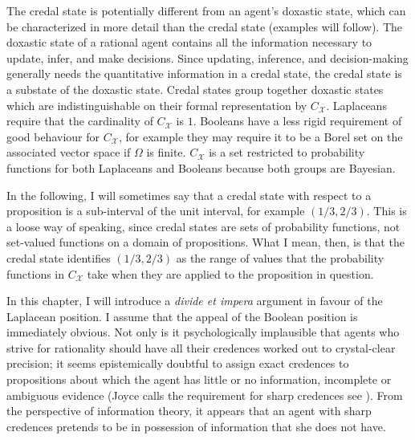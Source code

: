 \documentclass[phd,12pt,oneside]{ubcthesis}
\begin{document}
The credal state is potentially different from an agent's doxastic
state, which can be characterized in more detail than the credal state
(examples will follow). The doxastic state of a rational agent
contains all the information necessary to update, infer, and make
decisions. Since updating, inference, and decision-making generally
needs the quantitative information in a credal state, the credal state
is a substate of the doxastic state. Credal states group together
doxastic states which are indistinguishable on their formal
representation by $C_{\mathcal{X}}$. Laplaceans require that the
cardinality of $C_{\mathcal{X}}$ is $1$. Booleans have a less rigid
requirement of good behaviour for $C_{\mathcal{X}}$, for example they
may require it to be a Borel set on the associated vector space if
$\Omega$ is finite. $C_{\mathcal{X}}$ is a set restricted to
probability functions for both Laplaceans and Booleans because both
groups are Bayesian.

In the following, I will sometimes say that a credal state with
respect to a proposition is a sub-interval of the unit interval, for
example $(1/3,2/3)$. This is a loose way of speaking, since credal
states are sets of probability functions, not set-valued functions on
a domain of propositions. What I mean, then, is that the credal state
identifies $(1/3,2/3)$ as the range of values that the probability
functions in $C_{\mathcal{X}}$ take when they are applied to the
proposition in question.


In this chapter, I will introduce a \emph{divide et impera}
argument in favour of the Laplacean position. I assume that the appeal
of the Boolean position is immediately obvious. Not only is it
psychologically implausible that agents who strive for rationality
should have all their credences worked out to crystal-clear precision;
it seems epistemically doubtful to assign exact credences to
propositions about which the agent has little or no information,
incomplete or ambiguous evidence (Joyce calls the requirement for
sharp credences  see ). From
the perspective of information theory, it appears that an agent with
sharp credences pretends to be in possession of information that she
does not have.
\end{document}
